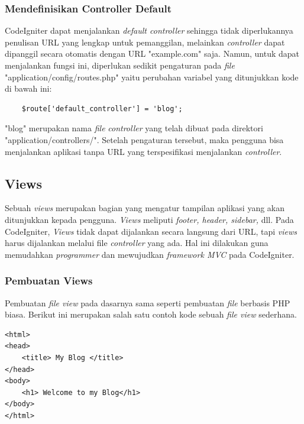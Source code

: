 \subsubsection{Mendefinisikan Controller Default}
\label{subsub: defaulController}

	CodeIgniter dapat menjalankan \textit{default controller} sehingga tidak diperlukannya penulisan URL yang lengkap untuk pemanggilan, melainkan \textit{controller} dapat dipanggil secara otomatis dengan URL "example.com" saja. Namun, untuk dapat menjalankan fungsi ini, diperlukan sedikit pengaturan pada \textit{file} "application/config/routes.php" yaitu perubahan variabel yang ditunjukkan kode di bawah ini:
	
	\begin{lstlisting}
	$route['default_controller'] = 'blog';
	\end{lstlisting}
	
	"blog" merupakan nama \textit{file} \textit{controller} yang telah dibuat pada direktori "application/controllers/". Setelah pengaturan tersebut, maka pengguna bisa menjalankan aplikasi tanpa URL yang terspesifikasi menjalankan \textit{controller}.
	
	\subsection{Views}
	\label{sub: views}
	
	Sebuah \textit{views} merupakan bagian yang mengatur tampilan aplikasi yang akan ditunjukkan kepada pengguna. \textit{Views} meliputi \textit{footer, header, sidebar,} dll.
	Pada CodeIgniter, \textit{Views} tidak dapat dijalankan secara langsung dari URL, tapi \textit{views} harus dijalankan melalui file \textit{controller} yang ada. Hal ini dilakukan guna memudahkan \textit{programmer} dan mewujudkan \textit{framework MVC} pada CodeIgniter.
	
	\subsubsection{Pembuatan Views}
	\label{subsub: pembuatanView}
	
	Pembuatan \textit{file view} pada dasarnya sama seperti pembuatan \textit{file} berbasis PHP biasa. Berikut ini merupakan salah satu contoh kode sebuah \textit{file view} sederhana.
	
	\begin{lstlisting}
<html>
<head>
	<title> My Blog </title>
</head>
<body>
	<h1> Welcome to my Blog</h1>
</body>
</html>
	\end{lstlisting}
	
